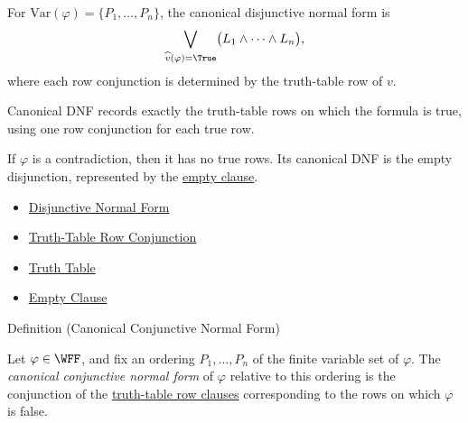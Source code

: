 \begin{remark*}
For \(\mathrm{Var}(\varphi)=\{P_1,\ldots,P_n\}\), the canonical
disjunctive normal form is
\[
\bigvee_{\widehat v(\varphi)=\True}
\bigl(L_1\land\cdots\land L_n\bigr),
\]
where each row conjunction is determined by the truth-table row of \(v\).
\end{remark*}

\begin{remark*}[Interpretation]
Canonical DNF records exactly the truth-table rows on which the formula is
true, using one row conjunction for each true row.
\end{remark*}

\begin{remark*}[Examples]
If \(\varphi\) is a contradiction, then it has no true rows. Its canonical DNF
is the empty disjunction, represented by the
\hyperref[def:empty-clause-propositional-logic]{empty clause}.
\end{remark*}

\begin{dependencies}
\begin{itemize}
  \item \hyperref[def:disjunctive-normal-form-propositional-logic]{Disjunctive Normal Form}
  \item \hyperref[def:truth-table-row-conjunction-propositional-logic]{Truth-Table Row Conjunction}
  \item \hyperref[def:truth-table-propositional-logic]{Truth Table}
  \item \hyperref[def:empty-clause-propositional-logic]{Empty Clause}
\end{itemize}
\end{dependencies}

\begin{definitionbox}{Definition (Canonical Conjunctive Normal Form)}
\begin{definition}
\label{def:canonical-conjunctive-normal-form-propositional-logic}
Let \(\varphi\in\WFF\), and fix an ordering \(P_1,\ldots,P_n\) of the finite
variable set of \(\varphi\). The \emph{canonical conjunctive normal form} of
\(\varphi\) relative to this ordering is the conjunction of the
\hyperref[def:truth-table-row-clause-propositional-logic]{truth-table row clauses}
corresponding to the rows on which \(\varphi\) is false.
\end{definition}
\end{definitionbox}

